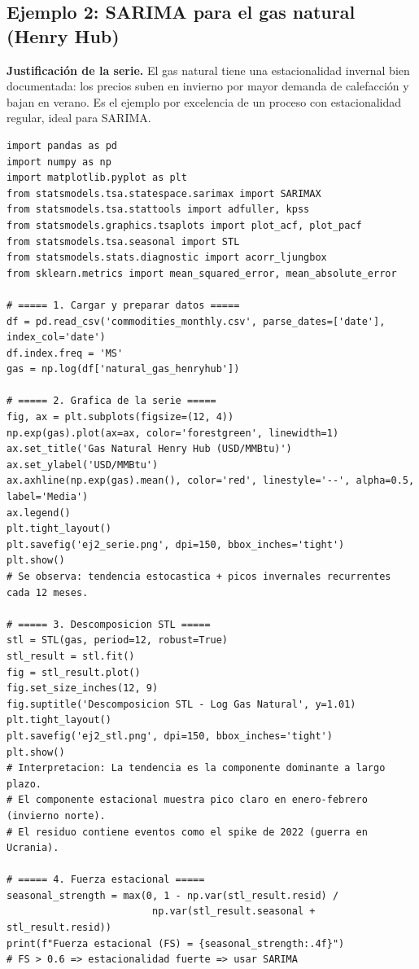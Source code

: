 \documentclass[12pt,a4paper]{article}
\theoremstyle{definition}
\begin{document}
\subsection{Ejemplo 2: SARIMA para el gas natural (Henry Hub)}

\noindent\textbf{Justificación de la serie.} El gas natural tiene una
estacionalidad invernal bien documentada: los precios suben en invierno por
mayor demanda de calefacción y bajan en verano. Es el ejemplo por excelencia
de un proceso con estacionalidad regular, ideal para SARIMA.

\begin{lstlisting}[style=python, caption={Ejemplo 2: SARIMA para log-precios del gas natural}]
import pandas as pd
import numpy as np
import matplotlib.pyplot as plt
from statsmodels.tsa.statespace.sarimax import SARIMAX
from statsmodels.tsa.stattools import adfuller, kpss
from statsmodels.graphics.tsaplots import plot_acf, plot_pacf
from statsmodels.tsa.seasonal import STL
from statsmodels.stats.diagnostic import acorr_ljungbox
from sklearn.metrics import mean_squared_error, mean_absolute_error

# ===== 1. Cargar y preparar datos =====
df = pd.read_csv('commodities_monthly.csv', parse_dates=['date'], index_col='date')
df.index.freq = 'MS'
gas = np.log(df['natural_gas_henryhub'])

# ===== 2. Grafica de la serie =====
fig, ax = plt.subplots(figsize=(12, 4))
np.exp(gas).plot(ax=ax, color='forestgreen', linewidth=1)
ax.set_title('Gas Natural Henry Hub (USD/MMBtu)')
ax.set_ylabel('USD/MMBtu')
ax.axhline(np.exp(gas).mean(), color='red', linestyle='--', alpha=0.5, label='Media')
ax.legend()
plt.tight_layout()
plt.savefig('ej2_serie.png', dpi=150, bbox_inches='tight')
plt.show()
# Se observa: tendencia estocastica + picos invernales recurrentes cada 12 meses.

# ===== 3. Descomposicion STL =====
stl = STL(gas, period=12, robust=True)
stl_result = stl.fit()
fig = stl_result.plot()
fig.set_size_inches(12, 9)
fig.suptitle('Descomposicion STL - Log Gas Natural', y=1.01)
plt.tight_layout()
plt.savefig('ej2_stl.png', dpi=150, bbox_inches='tight')
plt.show()
# Interpretacion: La tendencia es la componente dominante a largo plazo.
# El componente estacional muestra pico claro en enero-febrero (invierno norte).
# El residuo contiene eventos como el spike de 2022 (guerra en Ucrania).

# ===== 4. Fuerza estacional =====
seasonal_strength = max(0, 1 - np.var(stl_result.resid) /
                         np.var(stl_result.seasonal + stl_result.resid))
print(f"Fuerza estacional (FS) = {seasonal_strength:.4f}")
# FS > 0.6 => estacionalidad fuerte => usar SARIMA


\end{lstlisting}
\end{document}
